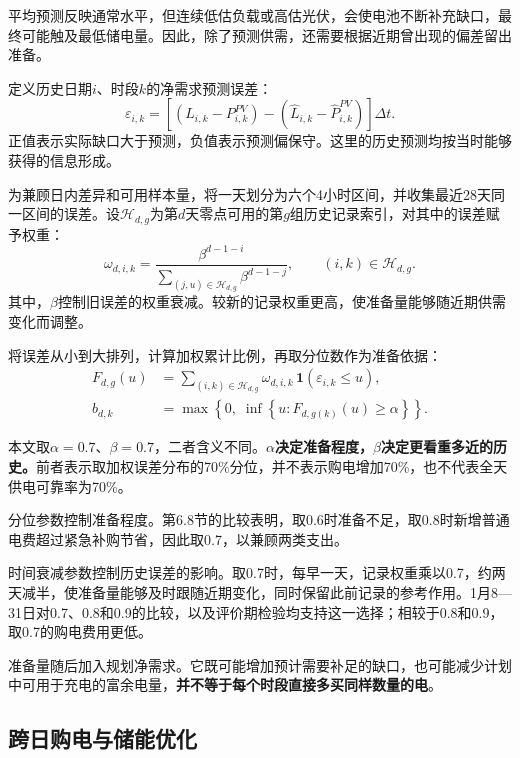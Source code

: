平均预测反映通常水平，但连续低估负载或高估光伏，会使电池不断补充缺口，最终可能触及最低储电量。因此，除了预测供需，还需要根据近期曾出现的偏差留出准备。

定义历史日期$i$、时段$k$的净需求预测误差：
\begin{equation}
\varepsilon_{i,k}=\left[\left(L_{i,k}-P^{PV}_{i,k}\right)-\left(\widehat L_{i,k}-\widehat P^{PV}_{i,k}\right)\right]\Delta t.
\label{eq:q2_error}
\end{equation}
正值表示实际缺口大于预测，负值表示预测偏保守。这里的历史预测均按当时能够获得的信息形成。

为兼顾日内差异和可用样本量，将一天划分为六个4小时区间，并收集最近28天同一区间的误差。设$\mathcal H_{d,g}$为第$d$天零点可用的第$g$组历史记录索引，对其中的误差赋予权重：
\begin{equation}
\omega_{d,i,k}=\frac{\beta^{d-1-i}}{\displaystyle\sum_{(j,u)\in\mathcal H_{d,g}}\beta^{d-1-j}},
\qquad (i,k)\in\mathcal H_{d,g}.
\label{eq:q2_weight}
\end{equation}
其中，$\beta$控制旧误差的权重衰减。较新的记录权重更高，使准备量能够随近期供需变化而调整。

将误差从小到大排列，计算加权累计比例，再取分位数作为准备依据：
\begin{align}
F_{d,g}(u)&=\sum_{(i,k)\in\mathcal H_{d,g}}\omega_{d,i,k}\,\mathbf 1(\varepsilon_{i,k}\le u),\label{eq:q2_cdf}\\
b_{d,k}&=\max\left\{0,\;\inf\left\{u:F_{d,g(k)}(u)\ge\alpha\right\}\right\}.\label{eq:q2_reserve}
\end{align}

本文取$\alpha=0.7$、$\beta=0.7$，二者含义不同。\textbf{$\alpha$决定准备程度，$\beta$决定更看重多近的历史。}前者表示取加权误差分布的70\%分位，并不表示购电增加70\%，也不代表全天供电可靠率为70\%。

分位参数控制准备程度。第6.8节的比较表明，取0.6时准备不足，取0.8时新增普通电费超过紧急补购节省，因此取0.7，以兼顾两类支出。

时间衰减参数控制历史误差的影响。取0.7时，每早一天，记录权重乘以0.7，约两天减半，使准备量能够及时跟随近期变化，同时保留此前记录的参考作用。1月8—31日对0.7、0.8和0.9的比较，以及评价期检验均支持这一选择；相较于0.8和0.9，取0.7的购电费用更低。

准备量随后加入规划净需求。它既可能增加预计需要补足的缺口，也可能减少计划中可用于充电的富余电量，\textbf{并不等于每个时段直接多买同样数量的电}。

\subsection{跨日购电与储能优化}

